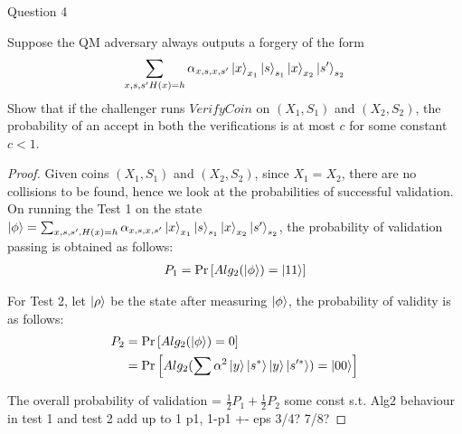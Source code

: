 \begin{solution}{Question 4}\label{ques:4}
    \begin{question}
    Suppose the QM adversary always outputs a forgery of the form
    \[\sum_{x,s,s'\\H(x) = h} \alpha_{x,s,x,s'}\ket{x}_{x_1}\ket{s}_{s_1}\ket{x}_{x_2}\ket{s'}_{s_2} \]
    Show that if the challenger runs $VerifyCoin$ on $ (X_1, S_1) $ and $(X_2, S_2)$, the probability of an accept in both the verifications is at most $c$ for some constant $c < 1$.
    \end{question}
    \tcblower{}
    \begin{proof}
    Given coins $(X_1, S_1)$ and $(X_2, S_2)$, since $X_1 = X_2$, there are no collisions to be found, hence we look at the probabilities of successful validation. On running the Test 1 on the state $\ket{\phi} = \sum_{x,s,s' , H(x) = h} \alpha_{x,s,x,s'}\ket{x}_{x_1}\ket{s}_{s_1}\ket{x}_{x_2}\ket{s'}_{s_2}$, the probability of validation passing is obtained as follows:
    \begin{equation}
        \begin{split}
            P_1 = \Pr\left[ Alg_2(\ket{\phi}) = \ket{11} \right]
        \end{split}
    \end{equation}

    For Test 2, let $\ket{\rho}$ be the state after measuring $\ket{\phi}$, the probability of validity is as follows:
    \begin{equation}
        \begin{split}
            P_2 &= \Pr\left[ Alg_2(\ket{\phi}) = 0 \right]\\
            &= \Pr\left[ Alg_2(\sum \alpha^2 \ket{y}\ket{s^*}\ket{y}\ket{s'^*}) = \ket{00} \right]
        \end{split}
    \end{equation}
    
    The overall probability of validation = $\frac{1}{2}P_1+\frac{1}{2}P_2$
    some const s.t. 
    Alg2 behaviour in test 1 and test 2 add up to 1 
    p1, 1-p1 +- eps
    3/4?
    7/8?
    
    \end{proof}
\end{solution}
 
